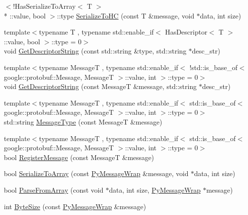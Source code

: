 \begin{DoxyCompactItemize}
$<$!Has\-Serialize\-To\-Array$<$ T $>$\\*
\-::value, bool $>$\-::type \hyperlink{namespaceapollo_1_1cyber_1_1message_a4bf197cbc2ae92e0a3ff9f705af2971b}{Serialize\-To\-H\-C} (const T \&message, void $\ast$data, int size)
\item 
{\footnotesize template$<$typename T , typename std\-::enable\-\_\-if$<$ Has\-Descriptor$<$ T $>$\-::value, bool $>$\-::type  = 0$>$ }\\void \hyperlink{namespaceapollo_1_1cyber_1_1message_adaa75b444b0befc8527210cfc29b1049}{Get\-Descriptor\-String} (const std\-::string \&type, std\-::string $\ast$desc\-\_\-str)
\item 
{\footnotesize template$<$typename Message\-T , typename std\-::enable\-\_\-if$<$ !std\-::is\-\_\-base\-\_\-of$<$ google\-::protobuf\-::\-Message, Message\-T $>$\-::value, int $>$\-::type  = 0$>$ }\\void \hyperlink{namespaceapollo_1_1cyber_1_1message_ab794defc8952601237ff80cd187ecec1}{Get\-Descriptor\-String} (const Message\-T \&message, std\-::string $\ast$desc\-\_\-str)
\item 
{\footnotesize template$<$typename Message\-T , typename std\-::enable\-\_\-if$<$ std\-::is\-\_\-base\-\_\-of$<$ google\-::protobuf\-::\-Message, Message\-T $>$\-::value, int $>$\-::type  = 0$>$ }\\std\-::string \hyperlink{namespaceapollo_1_1cyber_1_1message_a2d8177d4cd8dd056aaad524b1cb4137a}{Message\-Type} (const Message\-T \&message)
\item 
{\footnotesize template$<$typename Message\-T , typename std\-::enable\-\_\-if$<$ std\-::is\-\_\-base\-\_\-of$<$ google\-::protobuf\-::\-Message, Message\-T $>$\-::value, int $>$\-::type  = 0$>$ }\\bool \hyperlink{namespaceapollo_1_1cyber_1_1message_a186f9efe80c75467002d7f76509b96a9}{Register\-Message} (const Message\-T \&message)
\item 
bool \hyperlink{namespaceapollo_1_1cyber_1_1message_ab83eab8558ccf82e2af5b216c39acedd}{Serialize\-To\-Array} (const \hyperlink{classapollo_1_1cyber_1_1message_1_1PyMessageWrap}{Py\-Message\-Wrap} \&message, void $\ast$data, int size)
\item 
bool \hyperlink{namespaceapollo_1_1cyber_1_1message_a119266bb8560e3b93456580b373a11a9}{Parse\-From\-Array} (const void $\ast$data, int size, \hyperlink{classapollo_1_1cyber_1_1message_1_1PyMessageWrap}{Py\-Message\-Wrap} $\ast$message)
\item 
int \hyperlink{namespaceapollo_1_1cyber_1_1message_aa6e094242ba8c1c36c06edcc85d9fdf6}{Byte\-Size} (const \hyperlink{classapollo_1_1cyber_1_1message_1_1PyMessageWrap}{Py\-Message\-Wrap} \&message)

\end{DoxyCompactItemize}
